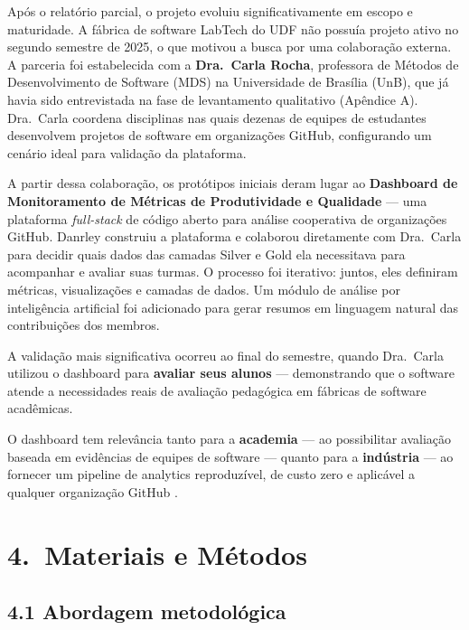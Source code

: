 \documentclass[
	12pt,
	openright,
	oneside,
	a4paper,
	brazil
]{abntex2}
\begin{document}
Após o relatório parcial, o projeto evoluiu significativamente em escopo e maturidade. A fábrica de software LabTech do UDF não possuía projeto ativo no segundo semestre de 2025, o que motivou a busca por uma colaboração externa. A parceria foi estabelecida com a \textbf{Dra.\ Carla Rocha}, professora de Métodos de Desenvolvimento de Software (MDS) na Universidade de Brasília (UnB), que já havia sido entrevistada na fase de levantamento qualitativo (Apêndice A). Dra.\ Carla coordena disciplinas nas quais dezenas de equipes de estudantes desenvolvem projetos de software em organizações GitHub, configurando um cenário ideal para validação da plataforma.

A partir dessa colaboração, os protótipos iniciais deram lugar ao \textbf{Dashboard de Monitoramento de Métricas de Produtividade e Qualidade} --- uma plataforma \textit{full-stack} de código aberto para análise cooperativa de organizações GitHub. Danrley construiu a plataforma e colaborou diretamente com Dra.\ Carla para decidir quais dados das camadas Silver e Gold ela necessitava para acompanhar e avaliar suas turmas. O processo foi iterativo: juntos, eles definiram métricas, visualizações e camadas de dados. Um módulo de análise por inteligência artificial foi adicionado para gerar resumos em linguagem natural das contribuições dos membros.

A validação mais significativa ocorreu ao final do semestre, quando Dra.\ Carla utilizou o dashboard para \textbf{avaliar seus alunos} --- demonstrando que o software atende a necessidades reais de avaliação pedagógica em fábricas de software acadêmicas.

O dashboard tem relevância tanto para a \textbf{academia} --- ao possibilitar avaliação baseada em evidências de equipes de software --- quanto para a \textbf{indústria} --- ao fornecer um pipeline de analytics reproduzível, de custo zero e aplicável a qualquer organização GitHub \cite{kitchenham2010s,ozkan2019agile}.

\section*{4.\ Materiais e Métodos}

\subsection*{4.1 Abordagem metodológica}
\end{document}

